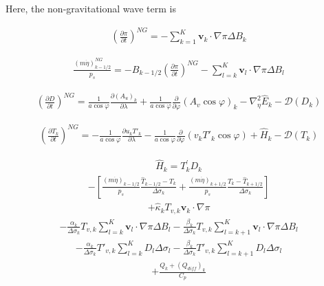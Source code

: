 Here, the non-gravitational wave term is

\begin{eqnarray}
  \left( \frac{\partial \pi}{\partial t} \right)^{NG}
   =   - \sum_{k=1}^{K} {\mathbf{v}}_{k} \cdot \nabla \pi  
       \Delta B_{k}
\end{eqnarray}

\begin{eqnarray}
  \frac{(m\dot{\eta})^{NG}_{k-1/2}}{p_s}
 = - B_{k-1/2} \left( \frac{\partial \pi}{\partial t} \right)^{NG}
   - \sum_{l=k}^{K} {\mathbf{v}}_{l} \cdot \nabla \pi
       \Delta B_{l}
\end{eqnarray}

\begin{eqnarray}
  \left( \frac{\partial D}{\partial t} \right)^{NG}
       =   \frac{1}{a\cos\varphi}
            \frac{\partial (A_u)_{k}}{\partial \lambda}
          + \frac{1}{a\cos\varphi}
            \frac{\partial }{\partial \varphi} (A_v \cos\varphi)_k
          - \nabla^{2}_{\eta} \hat{E}_{k} 
          - {\mathcal D}(D_{k}) 
\end{eqnarray}

\begin{eqnarray}
  \left( \frac{\partial T_{k}}{\partial t} \right)^{NG} 
      =   - \frac{1}{a\cos\varphi} 
               \frac{\partial u_k T'_k}{\partial \lambda}
          - \frac{1}{a\cos\varphi}
               \frac{\partial }{\partial \varphi} (v_k T'_k \cos\varphi)
          + \hat{H}_{k} 
          - {\mathcal D}(T_{k}) 
\end{eqnarray}

\begin{eqnarray}
 \hat{H}_k  =  T_{k}^{\prime} D_{k}
\end{eqnarray} \begin{eqnarray}
         - \left[   \frac{(m\dot{\eta})_{k-1/2}}{p_s} \frac{\hat{T}_{k-1/2} - T_k}{\Delta\sigma_k}
               + \frac{(m\dot{\eta})_{k+1/2}}{p_s} \frac{T_k - \hat{T}_{k+1/2}}{\Delta\sigma_k} \right]
\end{eqnarray} \begin{eqnarray}
         + \hat{\kappa}_{k} T_{v,k} {\mathbf{v}}_{k} \cdot \nabla \pi
\end{eqnarray} \begin{eqnarray}
         - \frac{\alpha_{k}}{\Delta \sigma_{k} } T_{v,k}
             \sum_{l=k}^{K} {\mathbf{v}}_{l} \cdot \nabla \pi 
               \Delta B_{l}
           - \frac{\beta_{k}}{\Delta \sigma_{k} } T_{v,k}
             \sum_{l=k+1}^{K} {\mathbf{v}}_{l} \cdot \nabla \pi 
               \Delta B_{l}
\end{eqnarray} \begin{eqnarray}
         - \frac{\alpha_{k}}{\Delta \sigma_{k} } T'_{v,k}
             \sum_{l=k}^{K} D_l  \Delta \sigma_{l}
           - \frac{\beta_{k}}{\Delta \sigma_{k} } T'_{v,k}
             \sum_{l=k+1}^{K} D_l  \Delta \sigma_{l}
\end{eqnarray} \begin{eqnarray}
         + \frac{Q_k + (Q_{diff})_k}{C_p}
\end{eqnarray}

